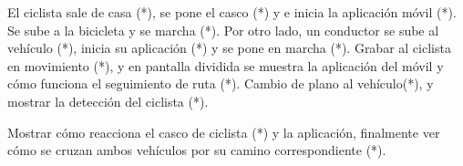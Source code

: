 El ciclista sale de casa (*), se pone el casco (*) y e inicia la aplicación
móvil (*). Se sube a la bicicleta y se marcha (*). Por otro lado, un conductor
se sube al vehículo (*), inicia su aplicación (*) y se pone en marcha (*).
Grabar al ciclista en movimiento (*), y en pantalla dividida se muestra la
aplicación del móvil y cómo funciona el seguimiento de ruta (*). Cambio de
plano al vehículo(*), y mostrar la detección del ciclista (*).

Mostrar cómo reacciona el casco de ciclista (*) y la aplicación, finalmente
ver cómo se cruzan ambos vehículos por su camino correspondiente (*).